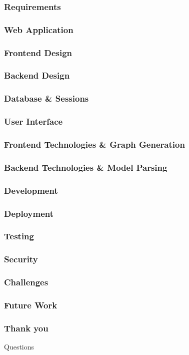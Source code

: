 \documentclass{beamer}
\begin{document}
\begin{frame}
    \frametitle{Requirements} 
\end{frame}

\begin{frame}
    \frametitle{Web Application} 
\end{frame}

\begin{frame}
    \frametitle{Frontend Design} 
\end{frame}

\begin{frame}
    \frametitle{Backend Design} 
\end{frame}

\begin{frame}
    \frametitle{Database \& Sessions}
\end{frame}

\begin{frame}
    \frametitle{User Interface}
\end{frame}

\begin{frame}
    \frametitle{Frontend Technologies \& Graph Generation}
\end{frame}

\begin{frame}
    \frametitle{Backend Technologies \& Model Parsing}
\end{frame}

\begin{frame}
    \frametitle{Development}
\end{frame}

\begin{frame}
    \frametitle{Deployment}
\end{frame}

\begin{frame}
    \frametitle{Testing}
\end{frame}

\begin{frame}
    \frametitle{Security}
\end{frame}

\begin{frame}
    \frametitle{Challenges}
\end{frame}

\begin{frame}
    \frametitle{Future Work}
\end{frame}

\begin{frame}
    \frametitle{Thank you}
    Questions
    \centering
\end{frame}
\end{document}
